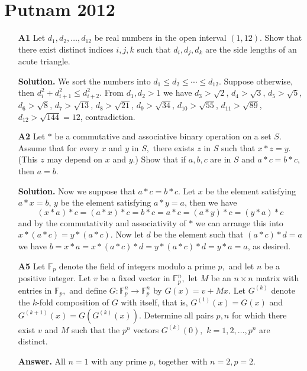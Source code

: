 \documentclass[11pt,a4paper]{article}
\newcommand{\<}{\langle}
\renewcommand{\>}{\rangle}
\begin{document}
\section{Putnam 2012}
\begin{enumerate}
	\item [\textbf{A1}]Let $d_1,d_2,\dots,d_{12}$ be real numbers in the open interval $(1,12).$ Show that there exist distinct indices $i,j,k$ such that $d_i,d_j,d_k$ are the side lengths of an acute triangle.
	
	\textbf{Solution.} We sort the numbers into $d_1 \le d_2 \le \cdots \le d_{12}$. Suppose otherwise, then $d_i^2+d_{i+1}^2\le d_{i+2}^2$. From $d_1, d_2 > 1$ we have $d_3>\sqrt{2}$, $d_4 > \sqrt{3}$, $d_5>\sqrt{5}$, $d_6 > \sqrt{8}$, $d_7 > \sqrt{13}$, $d_8 > \sqrt{21}$, $d_9 > \sqrt{34}$, $d_{10} > \sqrt{55}$, $d_{11} > \sqrt{89}$, $d_{12}>\sqrt{144}=12$, contradiction. 
	
	\item[\textbf{A2}] Let $*$ be a commutative and associative binary operation on a set $S.$ Assume that for every $x$ and $y$ in $S,$ there exists $z$ in $S$ such that $x*z=y.$ (This $z$ may depend on $x$ and $y.$) Show that if $a,b,c$ are in $S$ and $a*c=b*c,$ then $a=b.$
	
	\textbf{Solution.} Now we suppose that $a*c=b*c$. Let $x$ be the element satisfying $a*x=b$, $y$ be the element satisfying $a*y=a$, then we have
	\[(x * a) * c = (a * x) * c = b * c = a * c = (a * y) * c= (y * a) * c \]
	and by the commutativity and associativity of $*$ we can arrange this into $x * (a * c) = y * (a * c)$. Now let $d$ be the element such that $(a * c) * d = a$ we have $b = x * a = x * (a * c) * d = y * (a * c) * d = y * a = a$, as desired. 
	
	\item[\textbf{A5}]Let $\mathbb{F}_p$ denote the field of integers modulo a prime $p,$ and let $n$ be a positive integer. Let $v$ be a fixed vector in $\mathbb{F}_p^n,$ let $M$ be an $n\times n$ matrix with entries in $\mathbb{F}_p,$ and define $G:\mathbb{F}_p^n\to \mathbb{F}_p^n$ by $G(x)=v+Mx.$ Let $G^{(k)}$ denote the $k$-fold composition of $G$ with itself, that is, $G^{(1)}(x)=G(x)$ and $G^{(k+1)}(x)=G(G^{(k)}(x)).$ Determine all pairs $p,n$ for which there exist $v$ and $M$ such that the $p^n$ vectors $G^{(k)}(0),$ $k=1,2,\dots,p^n$ are distinct.
	
	\textbf{Answer.} All $n=1$ with any prime $p$, together with $n=2, p=2$. 
	

\end{enumerate}
\end{document}
